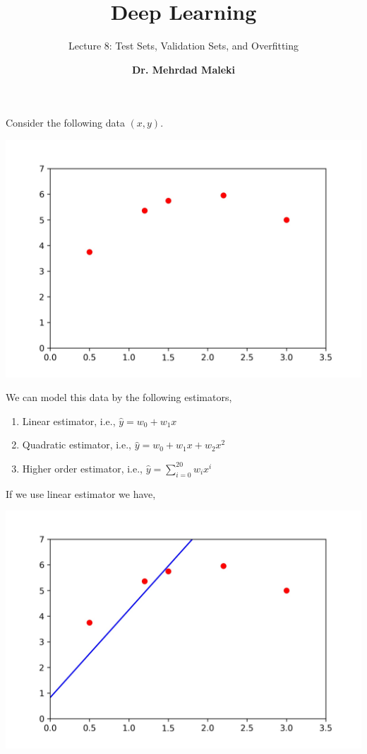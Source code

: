 \documentclass[12pt,aspectratio=169]{beamer}
\title{Deep Learning}
\subtitle{Lecture 8: Test Sets, Validation Sets, and Overfitting}
\author[]{\textbf{Dr. Mehrdad Maleki}}
\date{}
\begin{document}
 
\frame{\titlepage}

\begin{frame}
\frametitle{}
Consider the following data $(x,y)$. 
\begin{center}
\includegraphics[scale=0.7]{Quadratic}
\end{center}
\end{frame}

\begin{frame}
We can model this data by the following estimators,
\begin{enumerate}
\item Linear estimator, i.e., $\hat{y}=w_0+w_1x$\pause
\bigskip
\item Quadratic estimator, i.e., $\hat{y}=w_0+w_1x+w_2x^2$\pause
\bigskip
\item Higher order estimator, i.e., $\hat{y}=\sum_{i=0}^{20}w_ix^i$
\end{enumerate}
\end{frame}

\begin{frame}
If we use linear estimator we have,
\begin{center}
\includegraphics[scale=0.7]{Linear}
\end{center}
\end{frame}
\end{document}

